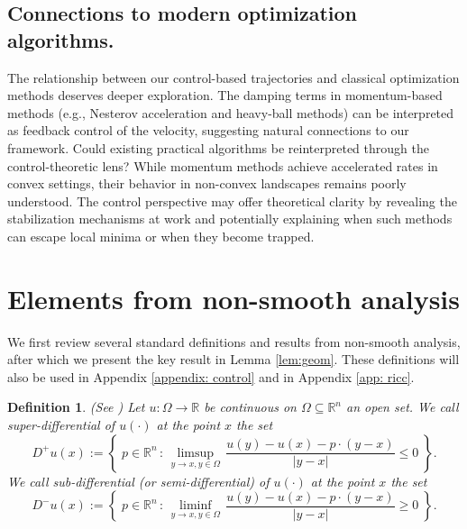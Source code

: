 \documentclass[12pt]{amsart}
\numberwithin{equation}{section}
\theoremstyle{plain}
\newtheorem{definition}[theorem]{Definition}
\begin{document}
\subsection*{Connections to modern optimization algorithms.} The relationship between our control-based trajectories and classical optimization methods deserves deeper exploration. The damping terms in momentum-based methods (e.g., Nesterov acceleration and  heavy-ball methods) can be interpreted as feedback control of the velocity, suggesting natural connections to our framework. Could existing practical algorithms be reinterpreted through the control-theoretic lens? While momentum methods achieve accelerated rates in convex settings, their behavior in non-convex landscapes remains poorly understood. The control perspective may offer theoretical clarity by revealing the stabilization mechanisms at work and potentially explaining when such methods can escape local minima or when they become trapped.





\appendix

\section{Elements from non-smooth analysis}\label{app: nonsmooth}

We first review several standard definitions and results from non-smooth analysis, after which we present the key result in Lemma \ref{lem:geom}. These definitions will also be used in Appendix \ref{appendix: control} and in Appendix \ref{app: ricc}.

\begin{definition}(See \cite[II.1, page 29]{bardi1997optimal})
Let $u:\Omega\to \mathbb{R}$ be continuous on $\Omega\subseteq \mathbb{R}^{n}$ an open set. We call super-differential of $u(\cdot)$ at the point $x$ the set
\begin{equation*}
    D^{+}u(x) := \left\{\; p\in\mathbb{R}^{n}\,:\, \limsup\limits_{y\to x, y\in\Omega} \, \frac{u(y) - u(x) - p\cdot(y-x)}{|y-x|} \leq 0 \;\right\}.
\end{equation*}
We call sub-differential (or semi-differential) of $u(\cdot)$ at the point $x$ the set
\begin{equation*}
    D^{-}u(x) := \left\{\; p\in\mathbb{R}^{n}\,:\, \liminf\limits_{y\to x, y\in\Omega} \, \frac{u(y) - u(x) - p\cdot(y-x)}{|y-x|} \geq 0 \;\right\}.
\end{equation*}
\end{definition}
\end{document}

